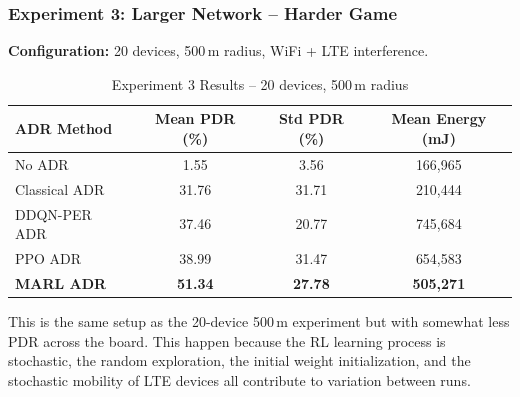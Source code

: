 \documentclass[12pt,a4paper]{article}
\begin{document}
\subsubsection{Experiment 3: Larger Network -- Harder Game}
\label{sec:exp3}

\textbf{Configuration:} 20 devices, 500\,m radius, WiFi + LTE interference.

\begin{table}[H]
\centering
\caption{Experiment 3 Results -- 20 devices, 500\,m radius}
\label{tab:exp3}
\begin{tabular}{@{}lccc@{}}
\toprule
\textbf{ADR Method} & \textbf{Mean PDR (\%)} & \textbf{Std PDR (\%)} & \textbf{Mean Energy (mJ)} \\
\midrule
No ADR          & 1.55  & 3.56  & 166,965 \\
Classical ADR   & 31.76 & 31.71 & 210,444 \\
DDQN-PER ADR    & 37.46 & 20.77 & 745,684 \\
PPO ADR         & 38.99 & 31.47 & 654,583 \\
\textbf{MARL ADR} & \textbf{51.34} & \textbf{27.78} & \textbf{505,271} \\
\bottomrule
\end{tabular}
\end{table}

This is the same setup as the 20-device 500\,m experiment but with somewhat less PDR across the board. This happen because the RL learning process is stochastic, the random exploration, the initial weight initialization, and the stochastic mobility of LTE devices all contribute to variation between runs.
\end{document}
